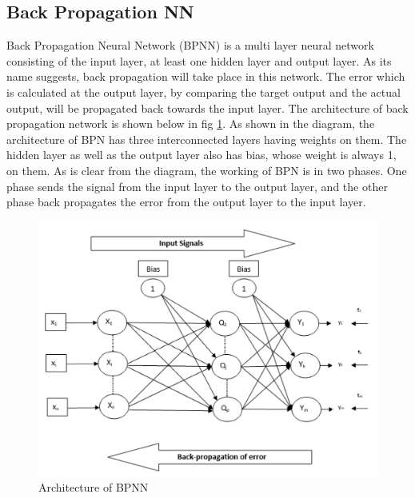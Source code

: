 \documentclass[a4paper, 12pt]{article}
\begin{document}
\subsection{Back Propagation NN}
Back Propagation Neural Network (BPNN) is a multi layer neural network consisting of the input layer, at least one hidden layer and output layer. As its name suggests, back propagation will take place in this network. The error which is calculated at the output layer, by comparing the target output and the actual output, will be propagated back towards the input layer. The architecture of back propagation network is shown below in fig \ref{fig2}. As shown in the diagram, the architecture of BPN has three interconnected layers having weights on them. The hidden layer as well as the output layer also has bias, whose weight is always 1, on them. As is clear from the diagram, the working of BPN is in two phases. One phase sends the signal from the input layer to the output layer, and the other phase back propagates the error from the output layer to the input layer. 
\begin{figure}[!h]
\includegraphics[height =2 in, width = \linewidth]{Architecture.png}
\caption{Architecture of BPNN}
\label{fig2}
\end{figure}
\end{document}
